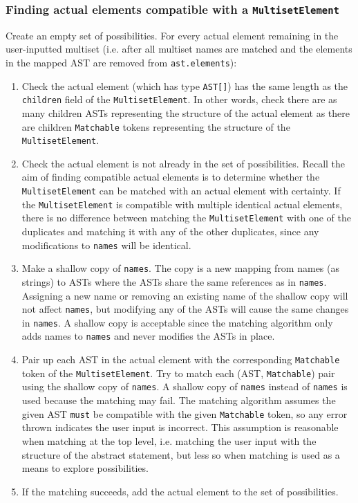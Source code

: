 \subsubsection{Finding actual elements compatible with a \texorpdfstring{\lstinline{MultisetElement}}{MultisetElement}}
Create an empty set of possibilities. For every actual element remaining in the user-inputted multiset (i.e. after all multiset names are matched and the elements in the mapped AST are removed from \lstinline{ast.elements}):
\begin{enumerate}
    \item Check the actual element (which has type \lstinline{AST[]}) has the same length as the \lstinline{children} field of the \lstinline{MultisetElement}. In other words, check there are as many children ASTs representing the structure of the actual element as there are children \lstinline{Matchable} tokens representing the structure of the \lstinline{MultisetElement}.
    \item Check the actual element is not already in the set of possibilities. Recall the aim of finding compatible actual elements is to determine whether the \lstinline{MultisetElement} can be matched with an actual element with certainty. If the \lstinline{MultisetElement} is compatible with multiple identical actual elements, there is no difference between matching the \lstinline{MultisetElement} with one of the duplicates and matching it with any of the other duplicates, since any modifications to \lstinline{names} will be identical.
    \item Make a shallow copy of \lstinline{names}. The copy is a new mapping from names (as strings) to ASTs where the ASTs share the same references as in \lstinline{names}. Assigning a new name or removing an existing name of the shallow copy will not affect \lstinline{names}, but modifying any of the ASTs will cause the same changes in \lstinline{names}. A shallow copy is acceptable since the matching algorithm only adds names to \lstinline{names} and never modifies the ASTs in place.
    \item Pair up each AST in the actual element with the corresponding \lstinline{Matchable} token of the \lstinline{MultisetElement}. Try to match each (AST, \lstinline{Matchable}) pair using the shallow copy of \lstinline{names}. A shallow copy of \lstinline{names} instead of \lstinline{names} is used because the matching may fail. The matching algorithm assumes the given AST \lstinline{must} be compatible with the given \lstinline{Matchable} token, so any error thrown indicates the user input is incorrect. This assumption is reasonable when matching at the top level, i.e. matching the user input with the structure of the abstract statement, but less so when matching is used as a means to explore possibilities.
    \item If the matching succeeds, add the actual element to the set of possibilities.
\end{enumerate}

